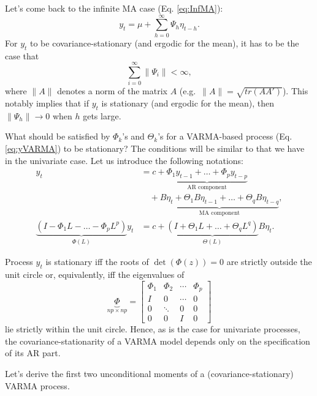 \documentclass[
  11pt,
]{book}
\theoremstyle{definition}
\theoremstyle{definition}
\theoremstyle{definition}
\theoremstyle{definition}
\theoremstyle{remark}
\begin{document}
Let's come back to the infinite MA case (Eq. \eqref{eq:InfMA}):
\[
y_t = \mu + \sum_{h=0}^\infty \Psi_{h} \eta_{t-h}.
\]
For \(y_t\) to be covariance-stationary (and ergodic for the mean), it has to be the case that
\begin{equation}
\sum_{i=0}^\infty \|\Psi_i\| < \infty,
\label{eq:condiInfiniteMA}
\end{equation}
where \(\|A\|\) denotes a norm of the matrix \(A\) (e.g.~\(\|A\|=\sqrt{tr(AA')}\)). This notably implies that if \(y_t\) is stationary (and ergodic for the mean), then \(\|\Psi_h\|\rightarrow 0\) when \(h\) gets large.

What should be satisfied by \(\Phi_k\)'s and \(\Theta_k\)'s for a VARMA-based process (Eq. \eqref{eq:yVARMA}) to be stationary? The conditions will be similar to that we have in the univariate case. Let us introduce the following notations:
\begin{equation}
\begin{aligned}
y_t
&= c
 + \underbrace{\Phi_1 y_{t-1} + \dots + \Phi_p y_{t-p}}_{\text{AR component}} \\
&\quad
 + \underbrace{B\eta_t + \Theta_1 B\eta_{t-1} + \dots + \Theta_q B\eta_{t-q}}_{\text{MA component}}, \\
\underbrace{(I - \Phi_1 L - \dots - \Phi_p L^p)}_{\Phi(L)}y_t
&= c
 + \underbrace{(I + \Theta_1 L + \dots + \Theta_q L^q)}_{\Theta(L)}B\eta_t.
\end{aligned}
\label{eq:VARMA2}
\end{equation}

Process \(y_t\) is stationary iff the roots of \(\det(\Phi(z))=0\) are strictly outside the unit circle or, equivalently, iff the eigenvalues of
\begin{equation}
\underbrace{\Phi}_{np \times np} = \left[\begin{array}{cccc}
\Phi_{1} & \Phi_{2} & \cdots & \Phi_{p}\\
I & 0 & \cdots & 0\\
0 & \ddots & 0 & 0\\
0 & 0 & I & 0\end{array}\right]
\label{eq:matrixPHI}
\end{equation}
lie strictly within the unit circle. Hence, as is the case for univariate processes, the covariance-stationarity of a VARMA model depends only on the specification of its AR part.

Let's derive the first two unconditional moments of a (covariance-stationary) VARMA process.
\end{document}
